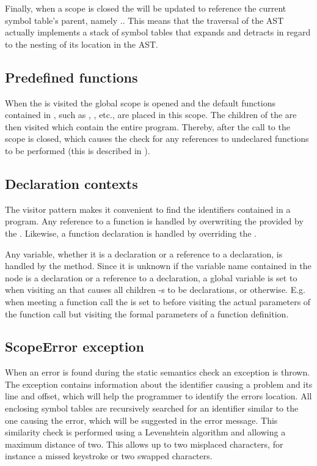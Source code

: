 Finally, when a scope is closed the  will be updated to reference the current symbol table's parent, namely ..
This means that the traversal of the AST actually implements a stack of symbol tables that expands and detracts in regard to the nesting of its location in the AST.

\subsection{Predefined functions}
When the   is visited the global scope is opened and the default functions contained in \productname{}, such as , , etc., are placed in this scope. 
The children of the  are then visited which contain the entire program. 
Thereby, after the call to  the scope is closed, which causes the check for any references to undeclared functions to be performed (this is described in ).

\subsection{Declaration contexts}
\label{sec:deccontext}
The visitor pattern makes it convenient to find the identifiers contained in a \productname{} program. Any reference to a function is handled by overwriting the  provided by the . Likewise, a function declaration is handled by overriding the .


Any variable, whether it is a declaration or a reference to a declaration, is handled by the  method. 
Since it is unknown if the variable name contained in the node is a declaration or a reference to a declaration, a global variable   is set to  when visiting an  that causes all children -s to be declarations, or  otherwise. 
E.g. when meeting a function call the  is set to  before visiting the actual parameters of the function call but visiting the formal parameters of a function definition.  


\subsection{ScopeError exception}
When an error is found during the static semantics check an exception is thrown. The exception contains information about the identifier causing a problem and its line and offset, which will help the programmer to identify the errors location. 
All enclosing symbol tables are recursively searched for an identifier similar to the one causing the error, which will be suggested in the error message. 
This similarity check is performed using a Levenshtein algorithm and allowing a maximum distance of two. 
This allows up to two misplaced characters, for instance a missed keystroke or two swapped characters.
